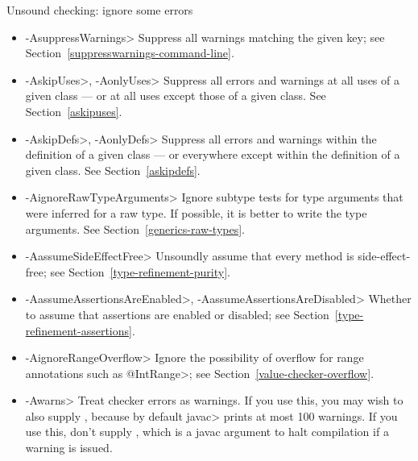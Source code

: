Unsound checking: ignore some errors
\begin{itemize}
\item \<-AsuppressWarnings>
  Suppress all warnings matching the given key; see
  Section~\ref{suppresswarnings-command-line}.
\item \<-AskipUses>, \<-AonlyUses>
  Suppress all errors and warnings at all uses of a given class --- or at all
  uses except those of a given class.  See Section~\ref{askipuses}.
\item \<-AskipDefs>, \<-AonlyDefs>
  Suppress all errors and warnings within the definition of a given class
  --- or everywhere except within the definition of a given class.  See
  Section~\ref{askipdefs}.
\item \<-AignoreRawTypeArguments>
  Ignore subtype tests for type arguments that were inferred for a raw
  type.  If possible, it is better to write the type arguments.  See
  Section~\ref{generics-raw-types}.
\item \<-AassumeSideEffectFree>
  Unsoundly assume that every method is side-effect-free; see
  Section~\ref{type-refinement-purity}.
\item \<-AassumeAssertionsAreEnabled>, \<-AassumeAssertionsAreDisabled>
  Whether to assume that assertions are enabled or disabled; see Section~\ref{type-refinement-assertions}.
\item \<-AignoreRangeOverflow>
  Ignore the possibility of overflow for range annotations such as
  \<@IntRange>; see Section~\ref{value-checker-overflow}.
\item \<-Awarns>
  Treat checker errors as warnings.  If you use this, you may wish to also
  supply , because by default \<javac> prints at
  most 100 warnings.  If you use this, don't supply ,
  which is a javac argument to halt compilation if a warning is issued.
\end{itemize}

